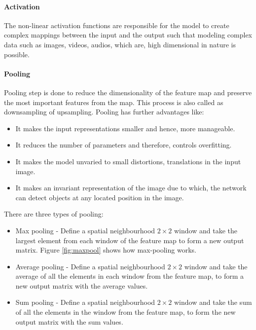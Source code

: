             \paragraph{Activation} The non-linear activation functions are responsible for the model to create complex mappings between the input and the output such that modeling complex data such as images, videos, audios, which are, high dimensional in nature is possible. 

            \paragraph{Pooling} Pooling step is done to reduce the dimensionality of the feature map and preserve the most important features from the map. 
            This process is also called as downsampling of upsampling.
            Pooling has further advantages like:
            \begin{itemize}
                \item It makes the input representations smaller and hence, more manageable.
                \item It reduces the number of parameters and therefore, controls overfitting.
                \item It makes the model unvaried to small distortions, translations in the input image.
                \item It makes an invariant representation of the image due to which, the network can detect objects at any located position in the image. 
            \end{itemize}

            There are three types of pooling: 
            \begin{itemize}
                \item Max pooling - Define a spatial neighbourhood $2\times2$ window and take the largest element from each window of the feature map to form a new output matrix. 
                Figure \ref{fig:maxpool} shows how max-pooling works. 
                
                \item Average pooling - Define a spatial neighbourhood $2\times2$ window and take the average of all the elements in each window from the feature map, to form a new output matrix with the average values.
                
                \item Sum pooling - Define a spatial neighbourhood $2\times2$ window and take the sum of all the elements in the window from the feature map, to form the new output matrix with the sum values.
            \end{itemize}
            
